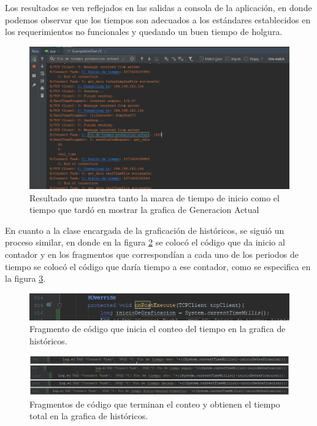 Los resultados se ven reflejados en las salidas a consola de la aplicación, en donde podemos observar que los tiempos son adecuados a los estándares establecidos en los requerimientos no funcionales y quedando un buen tiempo de holgura.  \\ \newline

\begin{figure}[H]
	\centering
	\includegraphics[scale=.6]{Capitulo5/images/TiempoGraficacionGAResultado.png}
	\caption{Resultado que muestra tanto la marca de tiempo de inicio como el tiempo que tardó en mostrar la grafica de Generacion Actual}	\label{fig:Tiempo_GraficacionGAR}
\end{figure} 

En cuanto a la clase encargada de la graficación de históricos, se siguió un proceso similar, en donde en la figura \ref{fig:Tiempo_GraficacionH} se colocó el código que da inicio al contador y en los fragmentos que correspondían a cada uno de los periodos de tiempo se colocó el código que daría tiempo a ese contador, como se especifica en la figura \ref{fig:Tiempo_GraficacionH2}. \\ \newline

\begin{figure}[H]
	\centering
	\includegraphics[scale=.6]{Capitulo5/images/TiempoGraficacionHistCodigo.png}
	\caption{Fragmento de código que inicia el conteo del tiempo en la grafica de históricos.}	\label{fig:Tiempo_GraficacionH}
\end{figure} 

\begin{figure}[H]
	\centering
	\includegraphics[scale=.6]{Capitulo5/images/TiempoGraficacionHistCodigo2.png}
	\caption{Fragmentos de código que terminan el conteo y obtienen el tiempo total en la grafica de históricos.}	\label{fig:Tiempo_GraficacionH2}
\end{figure} 

